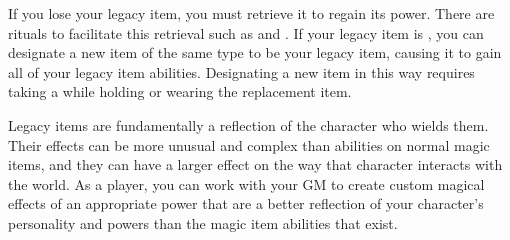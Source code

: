         If you lose your legacy item, you must retrieve it to regain its power.
        There are rituals to facilitate this retrieval such as  and .
        If your legacy item is , you can designate a new item of the same type to be your legacy item, causing it to gain all of your legacy item abilities.
        Designating a new item in this way requires taking a  while holding or wearing the replacement item.

            Legacy items are fundamentally a reflection of the character who wields them.
            Their effects can be more unusual and complex than abilities on normal magic items, and they can have a larger effect on the way that character interacts with the world.
            As a player, you can work with your GM to create custom magical effects of an appropriate power that are a better reflection of your character's personality and powers than the magic item abilities that exist.
